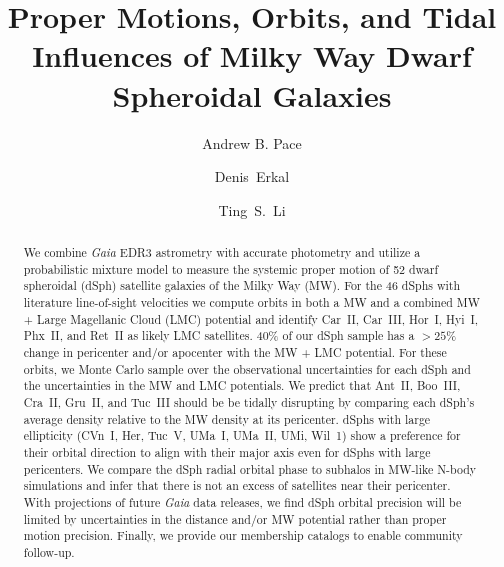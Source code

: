 \documentclass[twocolumn]{aastex63}
\begin{document}
\title{Proper Motions, Orbits, and Tidal Influences of Milky Way Dwarf Spheroidal Galaxies}




\author[0000-0002-6021-8760]{Andrew B. Pace}

\author[0000-0002-8448-5505]{Denis~Erkal}

\author[0000-0002-9110-6163]{Ting~S.~Li}



\begin{abstract}
{We combine {\it Gaia} EDR3 astrometry with accurate  photometry  and utilize a probabilistic mixture model to measure the systemic proper motion of 52  dwarf spheroidal (dSph) satellite galaxies of the Milky Way (MW). }
For the 46 dSphs  with literature line-of-sight velocities we compute orbits in both a MW and a combined MW + Large Magellanic Cloud (LMC) potential and identify {Car~II, Car~III,  Hor~I, Hyi~I, Phx~II, and Ret~II as} likely LMC satellites. 
{40\% of our dSph sample has a $>25\%$ change in  pericenter and/or apocenter with the MW + LMC potential.}
For these orbits, we Monte Carlo sample over the observational uncertainties for each dSph {and} the uncertainties in the MW and LMC potentials. 
{We predict that {Ant~II,  Boo~III, Cra~II, Gru~II, and Tuc~III} should be be tidally disrupting by comparing each dSph’s average density relative to the MW density at its pericenter.}
dSphs with large ellipticity {(CVn~I, Her, Tuc~V, UMa~I, UMa~II, UMi, Wil~1)} show a preference for their orbital direction to align with their major axis even {for dSphs with large pericenters}. 
We compare the {dSph} radial orbital phase to subhalos in MW-like N-body simulations and infer that there is not an excess of satellites near their pericenter. 
With {projections of} future {\it Gaia} data releases, we find {dSph} orbital precision  will be limited by uncertainties in {the} distance and/or  MW potential rather than proper motion precision. 
Finally, we provide our membership {catalogs} to enable community follow-up.
\end{abstract}



\end{document}
